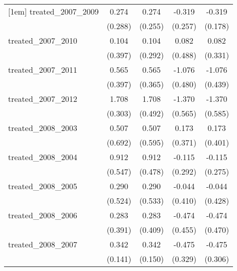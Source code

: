 {\begin{tabular}{l*{4}{c}}
[1em]
treated\_2007\_2009&       0.274         &       0.274         &      -0.319         &      -0.319         \\
            &     (0.288)         &     (0.255)         &     (0.257)         &     (0.178)         \\
[1em]
treated\_2007\_2010&       0.104         &       0.104         &       0.082         &       0.082         \\
            &     (0.397)         &     (0.292)         &     (0.488)         &     (0.331)         \\
[1em]
treated\_2007\_2011&       0.565         &       0.565         &      -1.076\sym{*}  &      -1.076\sym{*}  \\
            &     (0.397)         &     (0.365)         &     (0.480)         &     (0.439)         \\
[1em]
treated\_2007\_2012&       1.708\sym{***}&       1.708\sym{***}&      -1.370\sym{*}  &      -1.370\sym{*}  \\
            &     (0.303)         &     (0.492)         &     (0.565)         &     (0.585)         \\
[1em]
treated\_2008\_2003&       0.507         &       0.507         &       0.173         &       0.173         \\
            &     (0.692)         &     (0.595)         &     (0.371)         &     (0.401)         \\
[1em]
treated\_2008\_2004&       0.912         &       0.912         &      -0.115         &      -0.115         \\
            &     (0.547)         &     (0.478)         &     (0.292)         &     (0.275)         \\
[1em]
treated\_2008\_2005&       0.290         &       0.290         &      -0.044         &      -0.044         \\
            &     (0.524)         &     (0.533)         &     (0.410)         &     (0.428)         \\
[1em]
treated\_2008\_2006&       0.283         &       0.283         &      -0.474         &      -0.474         \\
            &     (0.391)         &     (0.409)         &     (0.455)         &     (0.470)         \\
[1em]
treated\_2008\_2007&       0.342\sym{*}  &       0.342\sym{*}  &      -0.475         &      -0.475         \\
            &     (0.141)         &     (0.150)         &     (0.329)         &     (0.306)         \\

\end{tabular}}
